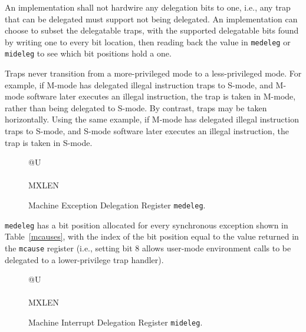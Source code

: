 An implementation shall not hardwire any delegation bits to one, i.e.,
any trap that can be delegated must support not being delegated.  An
implementation can choose to subset the delegatable traps, with the
supported delegatable bits found by writing one to every bit location,
then reading back the value in {\tt medeleg} or {\tt mideleg} to see
which bit positions hold a one.

Traps never transition from a more-privileged mode to a less-privileged mode.
For example, if M-mode has delegated illegal instruction traps to S-mode, and
M-mode software later executes an illegal instruction, the trap is taken in
M-mode, rather than being delegated to S-mode.  By contrast, traps may be
taken horizontally.  Using the same example, if M-mode has delegated illegal
instruction traps to S-mode, and S-mode software later executes an illegal
instruction, the trap is taken in S-mode.

\begin{figure}[h!]
{\footnotesize
\begin{center}
\begin{tabular}{@{}U}
 \\
\hline
{} \\
\hline
MXLEN \\
\end{tabular}
\end{center}
}
\vspace{-0.1in}
\caption{Machine Exception Delegation Register {\tt medeleg}.}
\label{medelegreg}
\end{figure}

{\tt medeleg} has a bit position allocated for every synchronous exception
shown in Table~\ref{mcauses}, with the index of the bit position equal to the
value returned in the {\tt mcause} register (i.e., setting bit 8 allows
user-mode environment calls to be delegated to a lower-privilege trap
handler).

\begin{figure}[h!]
{\footnotesize
\begin{center}
\begin{tabular}{@{}U}
 \\
\hline
{} \\
\hline
MXLEN \\
\end{tabular}
\end{center}
}
\vspace{-0.1in}
\caption{Machine Interrupt Delegation Register {\tt mideleg}.}
\label{midelegreg}
\end{figure}

